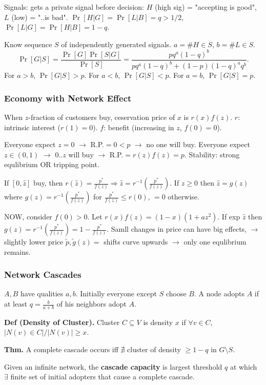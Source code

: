 \documentclass[a4paper,twocolumn,10pt]{article}
\newcommand{\pte}[1]{\left({#1}\right)}
\begin{document}
		Signals: gets a private signal before decision:
			$H$ (high sig) = "accepting is good",
			$L$ (low) = "..is bad".
			$\Pr[H|G]=\Pr[L|B]=q>1/2$, 
			$\Pr[L|G]=\Pr[H|B]=1-q$.

		Know sequence $S$ of independently generated signals.
		$a=\# H\in S$, $b=\# L\in S$.
		\[
			\Pr[G|S]=\frac{\Pr[G]\Pr[S|G]}{\Pr[S]}
				=\frac{pq^a(1-q)^b}{pq^a(1-q)^b+(1-p)(1-q)^aq^b}.
		\]
		For $a>b$, $\Pr[G|S]>p$.
		For $a<b$, $\Pr[G|S]<p$.
		For $a=b$, $\Pr[G|S]=p$.


	\subsubsection{Economy with Network Effect}
		When $z$-fraction of customers buy, ceservation price of $x$ is $r(x)f(z)$.
		$r$: intrinsic interest ($r(1)=0$).
		$f$: benefit (increasing in $z$, $f(0)=0$).
		
		Everyone expect $z=0$ $\to$ R.P.$=0<p$ $\to$ no one will buy.
		Everyone expect $z\in(0,1)$ $\to$ $0..z$ will buy
			$\to$ R.P.$=r(z)f(z)=p$.
		Stability: strong equlibrium OR tripping point.

		If $[0,\hat z]$ buy, then $r(\hat z)=\frac{p^*}{f(z)} \Longrightarrow
			\hat z=r^{-1}\pte{\frac{p^*}{f(z)}}$.
		If $z\ge 0$ then $\hat z=g(z)$ where $g(z)=r^{-1}\pte{\frac{p^*}{f(z)}}$
			for $\frac{p^*}{f(z)}\le r(0)$, $=0$ otherwise.

		NOW, consider $f(0)>0$. Let $r(x)f(z)=(1-x)(1+az^2)$.
		If exp $\hat z$ then $g(z)=r^{-1}\pte{\frac{p^*}{f(z)}}=1-\frac{p^*}{f(z)}$.
		Samll changes in price can have big effects,
		$\to$ slightly lower price $\tilde p,\tilde g(z)=$
			shifts curve upwards $\to$ only one equlibrium remains.

	\subsubsection{Network Cascades}
		$A,B$ have qualities $a,b$.
		Initially everyone except $S$ choose $B$.
		A node adopts $A$ if at least $q=\frac{b}{a+b}$ of his neighbors adopt $A$.

		\textbf{Def (Density of Cluster).}
			Cluster $C\subseteq V$ is density $x$ if $\forall v\in C$,
				$|N(v)\in C|/|N(v)| \ge x$.

		\textbf{Thm.}
			A complete cascade occurs iff $\nexists$ cluster of density $\ge 1-q$
				in $G\setminus S$.

		Given an infinite network,
		the \textbf{cascade capacity} is largest threshold $q$ at which
		$\exists$ finite set of initial adopters that cause a complete cascade.
\end{document}
